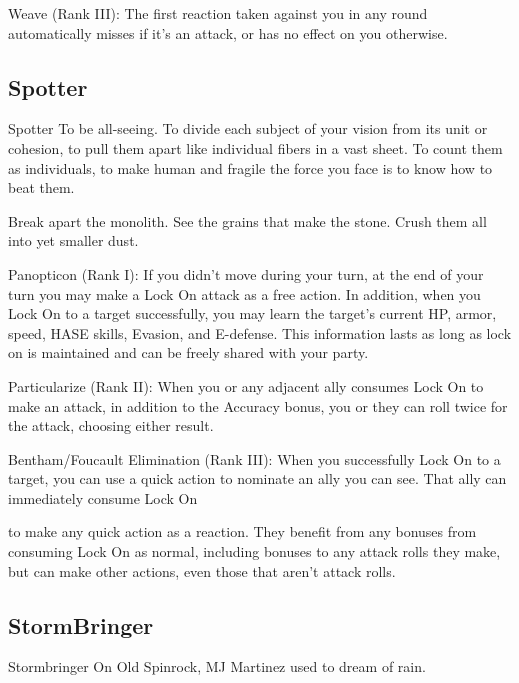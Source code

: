 Weave (Rank III): The first reaction taken against you in any round automatically misses if it’s an  
attack, or has no effect on you otherwise.
 
\subsection{Spotter}

                                                      Spotter  
To be all-seeing. To divide each subject of your vision from its unit or cohesion, to pull them apart  
like individual fibers in a vast sheet. To count them as individuals, to make human and fragile the  
force you face is to know how to beat them.   

Break apart the monolith. See the grains that make the stone. Crush them all into yet smaller  
dust.  
 
 
Panopticon (Rank I): If you didn’t move during your turn, at the end of your turn you may make  
a Lock On attack as a free action. In addition, when you Lock On to a target successfully, you  
may learn the target’s current HP, armor, speed, HASE skills, Evasion, and E-defense. This  
information lasts as long as lock on is maintained and can be freely shared with your party.
 
Particularize (Rank II): When you or any adjacent ally consumes Lock On to make an attack, in  
addition to the Accuracy bonus, you or they can roll twice for the attack, choosing either result.
 
Bentham/Foucault Elimination (Rank III): When you successfully Lock On to a target, you can  
use a quick action to nominate an ally you can see. That ally can immediately consume Lock On  

                                                                                                                    


to make any quick action as a reaction. They benefit from any bonuses from consuming Lock On  
as normal, including bonuses to any attack rolls they make, but can make other actions, even  
those that aren’t attack rolls.
 
\subsection{StormBringer}

                                                Stormbringer  
On Old Spinrock, MJ Martinez used to dream of rain.   

